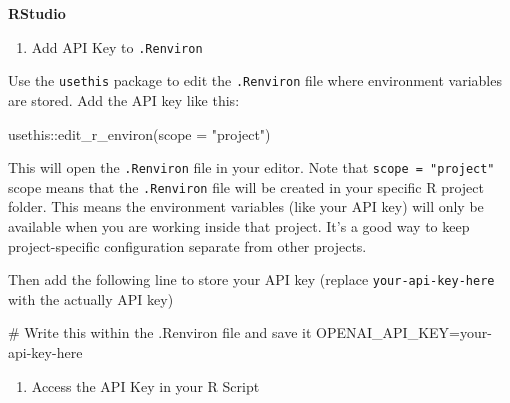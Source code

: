 \documentclass[
  letterpaper,
  DIV=11,
  numbers=noendperiod]{scrreprt}
\newenvironment{Shaded}{\begin{snugshade}}{\end{snugshade}}
\newcommand{\AttributeTok}[1]{\textcolor[rgb]{0.40,0.45,0.13}{#1}}
\newcommand{\CommentTok}[1]{\textcolor[rgb]{0.37,0.37,0.37}{#1}}
\newcommand{\FunctionTok}[1]{\textcolor[rgb]{0.28,0.35,0.67}{#1}}
\newcommand{\NormalTok}[1]{\textcolor[rgb]{0.00,0.23,0.31}{#1}}
\newcommand{\OtherTok}[1]{\textcolor[rgb]{0.00,0.23,0.31}{#1}}
\newcommand{\SpecialCharTok}[1]{\textcolor[rgb]{0.37,0.37,0.37}{#1}}
\newcommand{\StringTok}[1]{\textcolor[rgb]{0.13,0.47,0.30}{#1}}
\providecommand{\tightlist}{%
  \setlength{\itemsep}{0pt}\setlength{\parskip}{0pt}}\usepackage{longtable,booktabs,array}
\begin{document}
\begin{tcolorbox}[enhanced jigsaw, opacitybacktitle=0.6, breakable, title=\textcolor{quarto-callout-tip-color}{\faLightbulb}\hspace{0.5em}{Example implementations}, arc=.35mm, colframe=quarto-callout-tip-color-frame, colbacktitle=quarto-callout-tip-color!10!white, left=2mm, bottomrule=.15mm, opacityback=0, toprule=.15mm, bottomtitle=1mm, toptitle=1mm, titlerule=0mm, leftrule=.75mm, colback=white, rightrule=.15mm, coltitle=black]

\textbf{RStudio}

\begin{enumerate}
\def\labelenumi{\arabic{enumi}.}
\tightlist
\item
  Add API Key to \texttt{.Renviron}
\end{enumerate}

Use the \texttt{usethis} package to edit the \texttt{.Renviron} file
where environment variables are stored. Add the API key like this:

\begin{Shaded}
\begin{Highlighting}[]
\NormalTok{usethis}\SpecialCharTok{::}\FunctionTok{edit\_r\_environ}\NormalTok{(}\AttributeTok{scope =} \StringTok{"project"}\NormalTok{)}
\end{Highlighting}
\end{Shaded}

This will open the \texttt{.Renviron} file in your editor. Note that
\texttt{scope\ =\ "project"} scope means that the \texttt{.Renviron}
file will be created in your specific R project folder. This means the
environment variables (like your API key) will only be available when
you are working inside that project. It's a good way to keep
project-specific configuration separate from other projects.

Then add the following line to store your API key (replace
\texttt{your-api-key-here} with the actually API key)

\begin{Shaded}
\begin{Highlighting}[]
\CommentTok{\# Write this within the .Renviron file and save it}
\NormalTok{OPENAI\_API\_KEY}\OtherTok{=}\NormalTok{your}\SpecialCharTok{{-}}\NormalTok{api}\SpecialCharTok{{-}}\NormalTok{key}\SpecialCharTok{{-}}\NormalTok{here}
\end{Highlighting}
\end{Shaded}

\begin{enumerate}
\def\labelenumi{\arabic{enumi}.}
\setcounter{enumi}{1}
\tightlist
\item
  Access the API Key in your R Script
\end{enumerate}


\end{tcolorbox}
\end{document}
